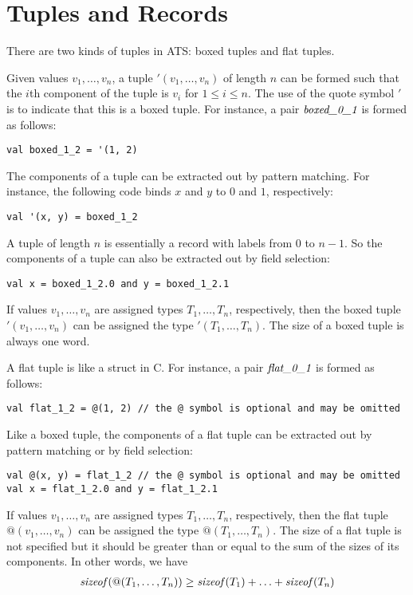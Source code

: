 
\section{Tuples and Records}
There are two kinds of tuples in ATS: boxed tuples and flat tuples.

Given values $v_1,\ldots, v_n$, a tuple $'(v_1,\ldots,v_n)$ of length $n$
can be formed such that the $i$th component of the tuple is $v_i$ for
$1\leq i\leq n$. The use of the quote symbol $'$ is to indicate that this
is a boxed tuple.  For instance, a pair $\mbox{\it boxed\_0\_1}$ is
formed as follows:
\begin{verbatim}
val boxed_1_2 = '(1, 2)
\end{verbatim}
The components of a tuple can be extracted out by pattern matching. For
instance, the following code binds $x$ and $y$ to $0$ and $1$,
respectively:
\begin{verbatim}
val '(x, y) = boxed_1_2
\end{verbatim}
A tuple of length $n$ is essentially a record with labels from $0$ to
$n-1$. So the components of a tuple can also be extracted out by field
selection:
\begin{verbatim}
val x = boxed_1_2.0 and y = boxed_1_2.1
\end{verbatim}
If values $v_1,\ldots,v_n$ are assigned types $T_1,\ldots,T_n$,
respectively, then the boxed tuple $'(v_1,\ldots,v_n)$ can be assigned the type
$'(T_1,\ldots,T_n)$. The size of a boxed tuple is always one word.

A flat tuple is like a struct in C. For instance, a pair $\mbox{\it
flat\_0\_1}$ is formed as follows:
\begin{verbatim}
val flat_1_2 = @(1, 2) // the @ symbol is optional and may be omitted
\end{verbatim}
Like a boxed tuple, the components of a flat tuple can be extracted out
by pattern matching or by field selection:
\begin{verbatim}
val @(x, y) = flat_1_2 // the @ symbol is optional and may be omitted
val x = flat_1_2.0 and y = flat_1_2.1
\end{verbatim}
If values $v_1,\ldots,v_n$ are assigned types $T_1,\ldots,T_n$,
respectively, then the flat tuple $@(v_1,\ldots,v_n)$ can be assigned the
type $@(T_1,\ldots,T_n)$. The size of a flat tuple is not specified but it
should be greater than or equal to the sum of the sizes of
its components. In other words, we have
\[\begin{array}{l}
{\it sizeof}(@(T_1,\ldots,T_n)) \geq {\it sizeof}(T_1) + \ldots + {\it sizeof}(T_n)
\end{array}\]

